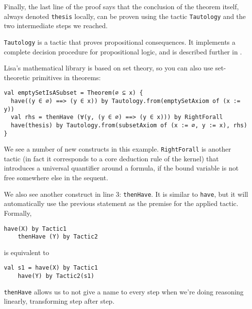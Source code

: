 Finally, the last line of the proof says that the conclusion of the theorem
itself, always denoted \lstinline|thesis| locally, can be proven using the
tactic \lstinline|Tautology| and the two intermediate steps we reached.

\lstinline|Tautology| is a tactic that proves propositional consequences. It
implements a complete decision procedure for propositional logic, and is
described further in .

Lisa's mathematical library is based on set theory, so you can also use
set-theoretic primitives in theorems:

\noindent
\begin{minipage}{\linewidth}\vspace{0.5em}
  \begin{lstlisting}[language=lisa, frame=single]
val emptySetIsASubset = Theorem(∅ ⊆ x) {
  have((y ∈ ∅) ==> (y ∈ x)) by Tautology.from(emptySetAxiom of (x := y))
  val rhs = thenHave (∀(y, (y ∈ ∅) ==> (y ∈ x))) by RightForall
  have(thesis) by Tautology.from(subsetAxiom of (x := ∅, y := x), rhs)
}
\end{lstlisting}
\end{minipage}

We see a number of new constructs in this example. \lstinline|RightForall| is
another tactic (in fact it corresponds to a core deduction rule of the kernel)
that introduces a universal quantifier around a formula, if the bound variable is not free
somewhere else in the sequent.

We also see another construct in line 3: \lstinline|thenHave|. It is similar to
\lstinline|have|, but it will automatically use the previous statement as the
premise for the applied tactic. Formally,

\noindent
\begin{minipage}{\linewidth}\vspace{1em}
  \begin{lstlisting}[language=lisa, frame=single, numbers=none]
    have(X) by Tactic1
    thenHave (Y) by Tactic2
\end{lstlisting}
\end{minipage}
%
is equivalent to

\noindent
\begin{minipage}{\linewidth}\vspace{1em}
  \begin{lstlisting}[language=lisa, frame=single, numbers=none]
    val s1 = have(X) by Tactic1
    have(Y) by Tactic2(s1)
\end{lstlisting}
\end{minipage}
\lstinline|thenHave| allows us to not give a name to every step when we're doing
reasoning linearly, transforming step after step. 

